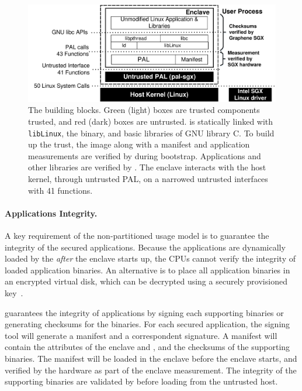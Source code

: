 \begin{figure}[t!]
\centering
\includegraphics[width=5.5in]{graphene-sgx/figures/architecture.pdf}
\footnotesize
\caption[The \graphenesgx{} building blocks]
{The \graphenesgx{} building blocks.
Green (light) boxes are trusted components trusted,
and red (dark) boxes are untrusted.
\graphenesgx{} is statically linked with {\tt libLinux},
the \libos{} binary, and basic libraries of GNU library C.
To build up the trust, the \graphenesgx{} image along with
a manifest and application measurements
are verified by \sgx{} during bootstrap. Applications and other libraries
are verified by \graphenesgx{}. The enclave interacts with the host kernel,
through untrusted PAL, on a narrowed untrusted interfaces with 41 functions.}
\label{fig:graphene:sgx-arch}
\end{figure}

\paragraph{Applications Integrity.}
A key requirement of the non-partitioned usage model is to guarantee the integrity of the secured applications.
Because the applications are dynamically loaded by the \libos{}
{\em after} the enclave starts up,
the CPUs cannot verify the integrity of loaded application binaries.
An alternative is to place all application binaries in an encrypted virtual disk,
which can be decrypted using a securely provisioned key~\citep{baumann14haven}.

\graphenesgx{} guarantees the integrity of applications
by signing each supporting binaries or generating checksums for the binaries.
For each secured application, the signing tool will generate
a manifest and a correspondent signature.
A manifest will contain the attributes of the enclave and \libos{},
and the checksums of the supporting binaries.
The manifest will be loaded in the enclave before the enclave starts,
and verified by the hardware as part of the enclave measurement.
The integrity of the supporting binaries
are validated by \pal{} before loading from the untrusted host.

